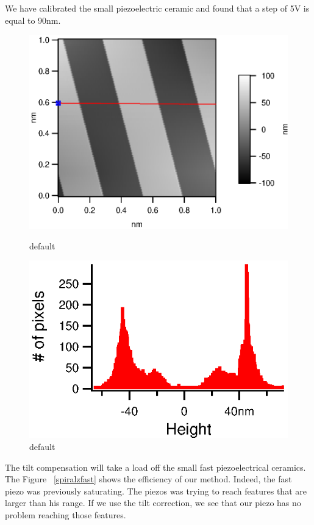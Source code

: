 We have calibrated the small piezoelectric ceramic and found that a step of 5V is equal to 90nm.
\begin{figure}[ht]
\begin{minipage}[b]{0.45\linewidth}
\centering
\includegraphics[width=\textwidth]{images/Calib1vPP_HeightMap.eps}
\caption{default}
\label{fig:figure1}
\end{minipage}
\hspace{0.5cm}
\begin{minipage}[b]{0.45\linewidth}
\centering
\includegraphics[width=\textwidth]{images/Calib1VppHisto.eps}
\caption{default}
\label{fig:figure2}
\end{minipage}
\end{figure}

The tilt compensation will take a load off the small fast piezoelectrical ceramics. The Figure ~\ref{spiralzfast} shows the efficiency of our method. Indeed, the fast piezo was previously saturating. The piezos was trying to reach features that are larger than his range. If we use the tilt correction, we see that our piezo has no problem reaching those features.



